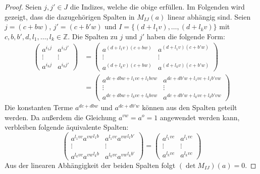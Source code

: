 {

\begin{proof}
    Seien $j,j' \in J$ die Indizes, welche die obige  erfüllen. Im Folgenden wird gezeigt, dass die dazugehörigen Spalten in $M_{IJ}(a)$ linear abhängig sind. Seien $j = (c + bw)$, $j' = (c + b'w)$ und $I = \{(d+l_1v),\dots,(d+l_kv)\}$ mit $c,b,b',d,l_1,\dots, l_k \in \mathbb{Z}$. Die Spalten zu $j$ und $j'$ haben die folgende Form:
    \begin{align*}
        \begin{pmatrix}
            a^{i_1j} & a^{i_1j'} \\
            \vdots & \vdots \\
            a^{i_kj} & a^{i_kj'}
        \end{pmatrix} &=
        \begin{pmatrix}
            a^{(d+l_1v)(c + bw)} & a^{(d+l_1v)(c + b'w)} \\
            \vdots & \vdots \\
            a^{(d+l_kv)(c + bw)} & a^{(d+l_kv)(c + b'w)}
        \end{pmatrix} \\
        &= \begin{pmatrix}
            a^{dc + dbw +l_1vc + l_1bvw} & a^{dc + db'w +l_1vc + l_1b'vw} \\
            \vdots & \vdots \\
            a^{dc + dbw +l_kvc + l_kbvw} & a^{dc + db'w +l_kvc + l_kb'vw}
        \end{pmatrix}
    \end{align*}
    Die konstanten Terme $a^{dc + dbw}$ und $a^{dc + db'w}$ können aus den Spalten geteilt werden. Da außerdem die Gleichung $a^{vw} = a^{o} = 1$ angewendet werden kann, verbleiben folgende äquivalente Spalten:
    \begin{equation*}
        \begin{pmatrix}
            a^{l_1vc} {a^{vw}}^{l_1b} & a^{l_1vc} {a^{vw}}^{l_1b'} \\
            \vdots & \vdots \\
            a^{l_kvc} {a^{vw}}^{l_kb} & a^{l_kvc} {a^{vw}}^{l_kb'}
        \end{pmatrix} =
        \begin{pmatrix}
            a^{l_1vc} & a^{l_1vc} \\
            \vdots & \vdots \\
            a^{l_kvc} & a^{l_kvc}
        \end{pmatrix}
    \end{equation*}
    Aus der linearen Abhängigkeit der beiden Spalten folgt $(\det M_{IJ})(a) = 0$.
\end{proof}

}
